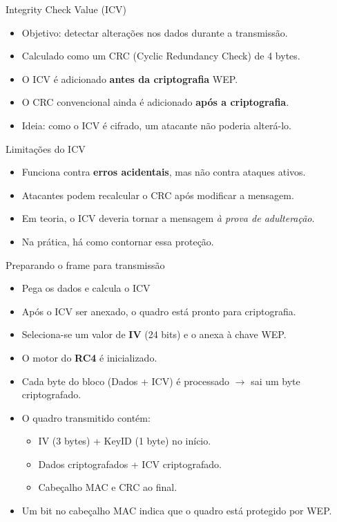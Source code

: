 \begin{frame}{Integrity Check Value (ICV)}
    \begin{itemize}
        \item Objetivo: detectar alterações nos dados durante a transmissão.
        \item Calculado como um CRC (Cyclic Redundancy Check) de 4 bytes.
        \item O ICV é adicionado \textbf{antes da criptografia} WEP.
        \item O CRC convencional ainda é adicionado \textbf{após a criptografia}.
        \item Ideia: como o ICV é cifrado, um atacante não poderia alterá-lo.
    \end{itemize}

\begin{block}{Limitações do ICV}
    \begin{itemize}
        \item Funciona contra \textbf{erros acidentais}, mas não contra ataques ativos.
        \item Atacantes podem recalcular o CRC após modificar a mensagem.
        \item Em teoria, o ICV deveria tornar a mensagem \textit{à prova de adulteração}.
        \item Na prática, há como contornar essa proteção.
    \end{itemize}
\end{block}
\end{frame}

\begin{frame}{Preparando o frame para transmissão}
    \begin{itemize}
    \item Pega os dados e calcula o ICV
        \item Após o ICV ser anexado, o quadro está pronto para criptografia.
        \item Seleciona-se um valor de \textbf{IV} (24 bits) e o anexa à chave WEP.
        \item O motor do \textbf{RC4} é inicializado.
        \item Cada byte do bloco (Dados + ICV) é processado $\rightarrow$ sai um byte criptografado.
        \item O quadro transmitido contém:
        \begin{itemize}
            \item IV (3 bytes) + KeyID (1 byte) no início.
            \item Dados criptografados + ICV criptografado.
            \item Cabeçalho MAC e CRC ao final.
        \end{itemize}
        \item Um bit no cabeçalho MAC indica que o quadro está protegido por WEP.
    \end{itemize}
\end{frame}

